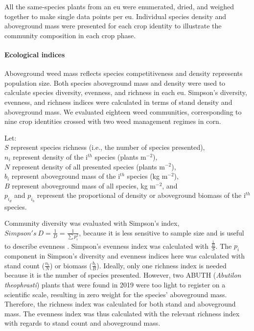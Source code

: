 \documentclass[
]{article}
\begin{document}
All the same-species plants from an eu were enumerated, dried, and weighed together to make single data points per eu. Individual species density and aboveground mass were presented for each crop identity to illustrate the community composition in each crop phase.

\hypertarget{ecological-indices}{%
\paragraph*{Ecological indices}\label{ecological-indices}}

Aboveground weed mass reflects species competitiveness and density represents population size. Both species aboveground mass and density were used to calculate species diversity, evenness, and richness in each eu. Simpson's diversity, evenness, and richness indices were calculated in terms of stand density and aboveground mass. We evaluated eighteen weed communities, corresponding to nine crop identities crossed with two weed management regimes in corn.

Let:\\
\(S\) represent species richness (i.e., the number of species presented),\\
\(n_i\) represent density of the i\(^{th}\) species (plants m\(^{-2}\)),\\
\(N\) represent density of all presented species (plants m\(^{-2}\)),\\
\(b_i\) represent aboveground mass of the i\(^{th}\) species (kg m\(^{-2}\)),\\
\(B\) represent aboveground mass of all species, kg m\(^{-2}\), and\\
\(p_{i_d}\) and \(p_{i_b}\) represent the proportional of density or aboveground biomass of the i\(^{th}\) species.

Community diversity was evaluated with Simpson's index, \(Simpson's\ D = \frac{1}{D} = \frac{1}{\sum p_i^2}\), because it is less sensitive to sample size and is useful to describe evenness \citep{nkoaWeedAbundanceDistribution2015}. Simpson's evenness index was calculated with \(\frac{\frac{1}{D}}{S}\). The \(p_i\) component in Simpson's diversity and evenness indices here was calculated with stand count (\(\frac{n_i}{N}\)) or biomass (\(\frac{b_i}{B}\)). Ideally, only one richness index is needed because it is the number of species presented. However, two ABUTH (\emph{Abutilon theophrasti}) plants that were found in 2019 were too light to register on a scientific scale, resulting in zero weight for the species' aboveground mass. Therefore, the richness index was calculated for both stand and aboveground mass. The evenness index was thus calculated with the relevant richness index with regards to stand count and aboveground mass.
\end{document}
